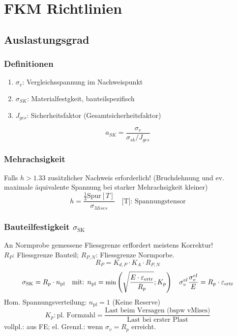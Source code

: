 \vspace{-2mm}
\section{FKM Richtlinien}{}
    \subsection{Auslastungsgrad}
     
        \subsubsection{Definitionen}
            \begin{enumerate}[noitemsep]
                \item $\sigma_{v}$: Vergleichsspannung im Nachweispunkt
                \item $\sigma_{SK}$: Materialfestgkeit, bauteilspezifisch
                \item $J_{ges}$: Sicherheitsfaktor (Gesamtsicherheitsfaktor)
            \end{enumerate}
            \vspace{-1mm}\[a_{SK} = \frac{\sigma_{v}}{\sigma_{sk}/J_{ges}} \]
    
        \subsubsection{Mehrachsigkeit}
            Falls $h > 1.33$ zusätzlicher Nachweis erforderlich! (Bruchdehnung und ev. maximale äquivalente Spannung bei starker Mehrachsigkeit kleiner)
            \vspace{-2mm}\[ h = \frac{\frac{1}{3} \textrm{Spur}[T]}{\sigma_{Mises}} \quad \textrm{[T]: Spannungstensor}\]
        \subsubsection{Bauteilfestigkeit $\sigma_{\textrm{SK}}$}
            An Normprobe gemessene Fliessgrenze erffordert meistens Korrektur! \\$R_P$: Fliessgrenze Bauteil; $R_{P,N}$: Fliessgrenze Normporbe.
            \vspace{-2mm}
            \[R_P = K_{d,P}\cdot K_A\cdot R_{P,N}\]
            \vspace{-4mm}
            \[\sigma_{\textrm{SK}}=R_p\cdot n_{\textrm{pl}} \quad\textrm{mit: } \small n_{\textrm{pl}}=\textrm{min} \left( \sqrt{ \frac{E\cdot\varepsilon_{\textrm{ertr}}}{R_p}};K_p \right) \quad \sigma_v^{el}\frac{\sigma_v^{el}}{E}=R_p\cdot\varepsilon_{\textrm{ertr}}\]\normalsize
            Hom. Spannungsverteilung: $n_{\textrm{pl}}=1$ (Keine Reserve)
            \vspace{-1mm}
            \[K_p: \textrm{pl. Formzahl} = \frac{\textrm{Last beim Versagen 
            (bspw vMises)}}{\textrm{Last bei erster Plast}}\]
            vollpl.: aus FE; el. Grenzl.: wenn $\sigma_v = R_p$ erreicht.
